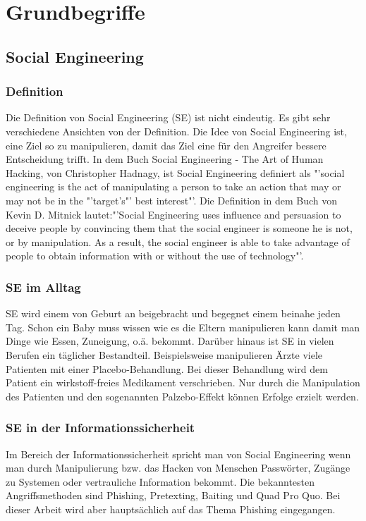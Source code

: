 
\chapter {Grundbegriffe}  %
\label{cha:grundlagen} %

\section{Social Engineering} %
\label {sec:Unterkapitel} %
	\subsection{Definition}
	Die Definition von Social Engineering (SE) ist nicht eindeutig. Es gibt sehr verschiedene Ansichten von der Definition. Die Idee von Social Engineering ist, eine Ziel so zu manipulieren, damit das Ziel eine für den Angreifer bessere Entscheidung trifft. In dem Buch Social Engineering - The Art of Human Hacking, von Christopher Hadnagy, ist Social Engineering definiert als "'social engineering is the act of manipulating a person to take an action that may or may not be in the "'target’s"' best interest"'\cite{ArtOfHumanHacking}. Die Definition in dem Buch von Kevin D. Mitnick lautet:"'Social Engineering uses influence and persuasion to deceive people by convincing them that the social engineer is someone he is not, or by manipulation. As a result, the social engineer is able to take advantage of people to obtain information with or without the use of technology"'\cite{ArtOfDeception}.\\
	
	\subsection{SE im Alltag}
	SE wird einem von Geburt an beigebracht und begegnet einem beinahe jeden Tag. Schon ein Baby muss wissen wie es die Eltern manipulieren kann damit man Dinge wie Essen, Zuneigung, o.ä. bekommt. Darüber hinaus ist SE in vielen Berufen ein täglicher Bestandteil. Beispielsweise manipulieren Ärzte viele Patienten mit einer Placebo-Behandlung. Bei dieser Behandlung wird dem Patient ein wirkstoff-freies Medikament verschrieben. Nur durch die Manipulation des Patienten und den sogenannten Palzebo-Effekt können Erfolge erzielt werden.\\
	
	\subsection{SE in der Informationssicherheit}
	Im Bereich der Informationssicherheit spricht man von Social Engineering wenn man durch Manipulierung bzw. das Hacken von Menschen Passwörter, Zugänge zu Systemen oder vertrauliche Information bekommt. Die bekanntesten Angriffsmethoden sind Phishing, Pretexting, Baiting und Quad Pro Quo. Bei dieser Arbeit wird aber hauptsächlich auf das Thema Phishing eingegangen.

